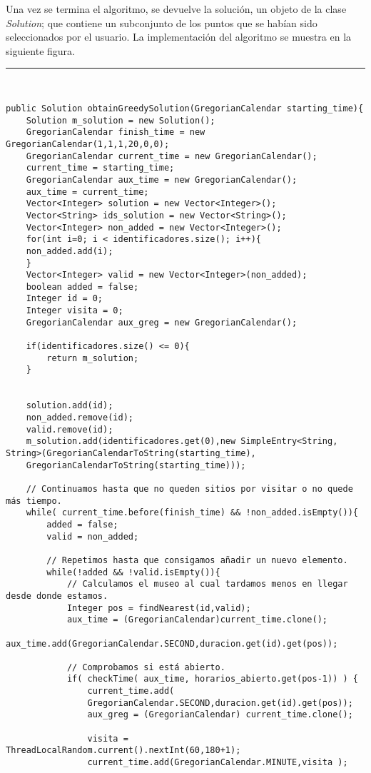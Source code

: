 Una vez se termina el algoritmo, se devuelve la solución, un objeto de la clase \textit{Solution}; que contiene un subconjunto de los puntos que se habían sido seleccionados por el usuario. La implementación del algoritmo se muestra en la siguiente figura.\newline
\noindent\rule[-1ex]{\textwidth}{1pt}\\
\begin{lstlisting}[caption=Función para encontrar la ruta entre los puntos seleccionados.]
public Solution obtainGreedySolution(GregorianCalendar starting_time){
	Solution m_solution = new Solution();
	GregorianCalendar finish_time = new GregorianCalendar(1,1,1,20,0,0);
	GregorianCalendar current_time = new GregorianCalendar();
	current_time = starting_time;
	GregorianCalendar aux_time = new GregorianCalendar();
	aux_time = current_time;
	Vector<Integer> solution = new Vector<Integer>();
	Vector<String> ids_solution = new Vector<String>();
	Vector<Integer> non_added = new Vector<Integer>();
	for(int i=0; i < identificadores.size(); i++){
	non_added.add(i);
	}
	Vector<Integer> valid = new Vector<Integer>(non_added);
	boolean added = false;
	Integer id = 0;
	Integer visita = 0;
	GregorianCalendar aux_greg = new GregorianCalendar();
	
	if(identificadores.size() <= 0){
		return m_solution;
	}
	

	solution.add(id);
	non_added.remove(id);
	valid.remove(id);
	m_solution.add(identificadores.get(0),new SimpleEntry<String, String>(GregorianCalendarToString(starting_time),
	GregorianCalendarToString(starting_time)));
	
	// Continuamos hasta que no queden sitios por visitar o no quede más tiempo.
	while( current_time.before(finish_time) && !non_added.isEmpty()){
		added = false;
		valid = non_added;
		
		// Repetimos hasta que consigamos añadir un nuevo elemento.
		while(!added && !valid.isEmpty()){
			// Calculamos el museo al cual tardamos menos en llegar desde donde estamos.
			Integer pos = findNearest(id,valid);
			aux_time = (GregorianCalendar)current_time.clone();
			aux_time.add(GregorianCalendar.SECOND,duracion.get(id).get(pos));
			
			// Comprobamos si está abierto.
			if( checkTime( aux_time, horarios_abierto.get(pos-1)) ) {
				current_time.add(
				GregorianCalendar.SECOND,duracion.get(id).get(pos));
				aux_greg = (GregorianCalendar) current_time.clone();
				
				visita = ThreadLocalRandom.current().nextInt(60,180+1);
				current_time.add(GregorianCalendar.MINUTE,visita );
				

\end{lstlisting}
